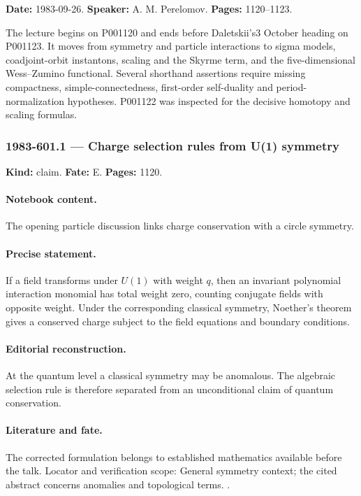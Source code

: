 \label{talk:601}

\noindent\textbf{Date:} 1983-09-26. \textbf{Speaker:} A. M. Perelomov. \textbf{Pages:} 1120--1123.\par

The lecture begins on P001120 and ends before Daletskii's3 October heading on P001123. It moves from symmetry and particle interactions to sigma models, coadjoint-orbit instantons, scaling and the Skyrme term, and the five-dimensional Wess--Zumino functional. Several shorthand assertions require missing compactness, simple-connectedness, first-order self-duality and period-normalization hypotheses. P001122 was inspected for the decisive homotopy and scaling formulas.

\subsubsection{1983-601.1 --- Charge selection rules from U(1) symmetry}

\label{item:1983-601.1}

\noindent\textbf{Kind:} claim. \textbf{Fate:} E. \textbf{Pages:} 1120.\par

\paragraph{Notebook content.} The opening particle discussion links charge conservation with a circle symmetry.

\paragraph{Precise statement.} If a field transforms under \(U(1)\) with weight \(q\), then an invariant polynomial interaction monomial has total weight zero, counting conjugate fields with opposite weight. Under the corresponding classical symmetry, Noether's theorem gives a conserved charge subject to the field equations and boundary conditions.

\paragraph{Editorial reconstruction.} At the quantum level a classical symmetry may be anomalous. The algebraic selection rule is therefore separated from an unconditional claim of quantum conservation.

\paragraph{Literature and fate.} The corrected formulation belongs to established mathematics available before the talk. Locator and verification scope: General symmetry context; the cited abstract concerns anomalies and topological terms. \cite{witten1983global}.

